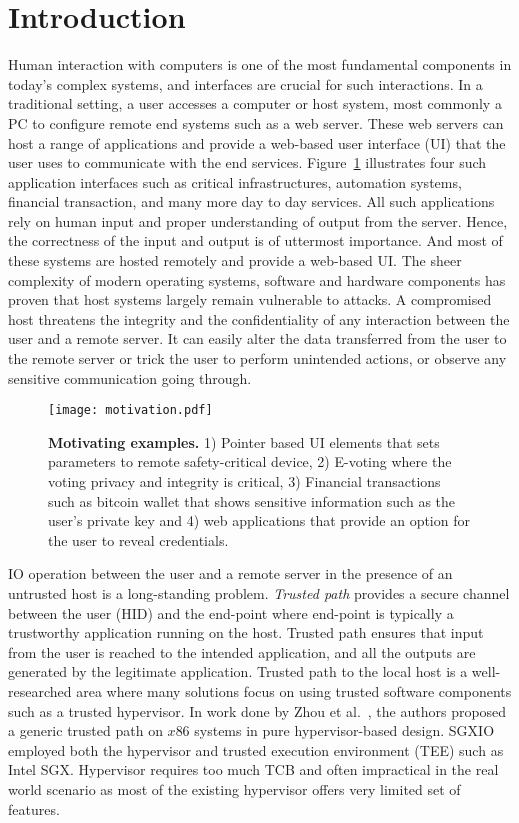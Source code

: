 \section{Introduction}
\label{sec:intro}

Human interaction with computers is one of the most fundamental components in today's complex systems, and interfaces are crucial for such interactions. In a traditional setting, a user accesses a computer or host system, most commonly a PC to configure remote end systems such as a web server. These web servers can host a range of applications and provide a web-based user interface (UI) that the user uses to communicate with the end services. Figure~\ref{fig:motivation} illustrates four such application interfaces such as critical infrastructures, automation systems, financial transaction, and many more day to day services. All such applications rely on human input and proper understanding of output from the server. Hence, the correctness of the input and output is of uttermost importance. And most of these systems are hosted remotely and provide a web-based UI. The sheer complexity of modern operating systems, software and hardware components has proven that host systems largely remain vulnerable to attacks. 
A compromised host threatens the integrity and the confidentiality of any interaction between the user and a remote server. It can easily alter the data transferred from the user to the remote server or trick the user to perform unintended actions, or observe any sensitive communication going through.

\begin{figure}[t]
\centering
\texttt{[image: motivation.pdf]}
\caption{\textbf{Motivating examples.} 1) Pointer based UI elements that sets parameters to remote safety-critical device, 2) E-voting where the voting privacy and integrity is critical, 3) Financial transactions such as bitcoin wallet that shows sensitive information such as the user's private key and 4) web applications that provide an option for the user to reveal credentials.}
\spacesave
\label{fig:motivation}
\centering
\end{figure}


IO operation between the user and a remote server in the presence of an untrusted host is a long-standing problem. \emph{Trusted path} provides a secure channel between the user (HID) and the end-point where end-point is typically a trustworthy application running on the host. Trusted path ensures that input from the user is reached to the intended application, and all the outputs are generated by the legitimate application. Trusted path to the local host is a well-researched area where many solutions focus on using trusted software components such as a trusted hypervisor. In work done by Zhou et al.~\cite{zhou2012building}, the authors proposed a generic trusted path on $x86$ systems in pure hypervisor-based design. SGXIO~\cite{weiser2017sgxio} employed both the hypervisor and trusted execution environment (TEE) such as Intel SGX. Hypervisor requires too much TCB and often impractical in the real world scenario as most of the existing hypervisor offers very limited set of features.

